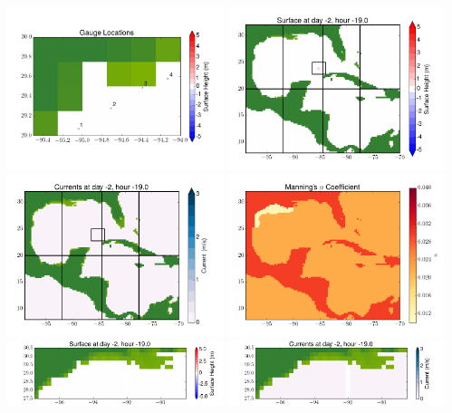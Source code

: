 \documentclass[11pt]{article}
\begin{document}
\includegraphics[width=0.475\textwidth]{frame0004fig10.png}
\vskip 10pt 
\includegraphics[width=0.475\textwidth]{frame0005fig1.png}
\includegraphics[width=0.475\textwidth]{frame0005fig2.png}
\vskip 10pt 
\includegraphics[width=0.475\textwidth]{frame0005fig3.png}
\includegraphics[width=0.475\textwidth]{frame0005fig4.png}
\vskip 10pt 
\includegraphics[width=0.475\textwidth]{frame0005fig5.png}
\end{document}
